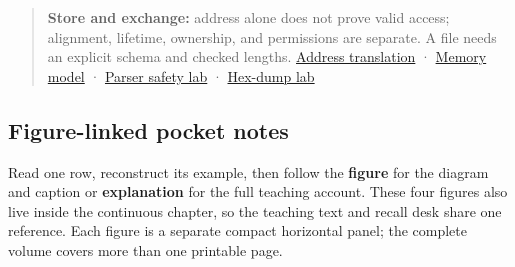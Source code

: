\begin{quote}
\textbf{Store and exchange:} address alone does not prove valid access; alignment, lifetime, ownership, and permissions are separate. A file needs an explicit schema and checked lengths. \href{Continuous\%20Notes/Computing\%20Foundations\%20-\%20From\%20Bits\%20to\%20C++\%20and\%20Systems\%20APIs\#Virtual\%20memory\%20translates\%20page\%20identity}{Address translation} · \href{Continuous\%20Notes/Computing\%20Foundations\%20-\%20From\%20Bits\%20to\%20C++\%20and\%20Systems\%20APIs\#Storage,\%20lifetime,\%20ownership,\%20and\%20placement\%20are\%20different\%20axes}{Memory model} · \href{Continuous\%20Notes/Computing\%20Foundations\%20-\%20From\%20Bits\%20to\%20C++\%20and\%20Systems\%20APIs\#Validate\%20lengths\%20before\%20performing\%20the\%20arithmetic\%20they\%20request}{Parser safety lab} · \href{Continuous\%20Notes/Computing\%20Foundations\%20-\%20From\%20Bits\%20to\%20C++\%20and\%20Systems\%20APIs\#Read\%20a\%20dump\%20by\%20reversing\%20the\%20contract}{Hex-dump lab}
\end{quote}

\subsection{Figure-linked pocket notes}\label{figure-linked-pocket-notes}

Read one row, reconstruct its example, then follow the \textbf{figure} for the diagram and caption or \textbf{explanation} for the full teaching account. These four figures also live inside the continuous chapter, so the teaching text and recall desk share one reference. Each figure is a separate compact horizontal panel; the complete volume covers more than one printable page.

